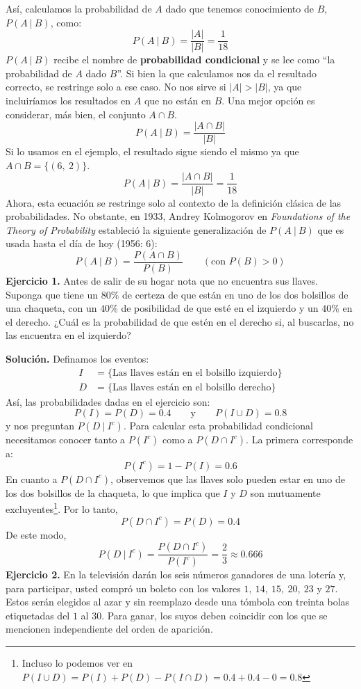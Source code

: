 \documentclass[12pt]{article}
\begin{document}
Así, calculamos la probabilidad de $A$ dado que tenemos conocimiento de $B$, $P(A \ | \ B)$, como:
\[
  P(A \ | \ B) = \frac{|A|}{|B|} = \frac{1}{18}
\]
$P(A \ | \ B)$ recibe el nombre de \textbf{probabilidad condicional} y se lee como ``la probabilidad de $A$ dado $B$''. Si bien la que calculamos nos da el resultado correcto, se restringe solo a ese caso. No nos sirve si $|A| > |B|$, ya que incluiríamos los resultados en $A$ que no están en $B$. Una mejor opción es considerar, más bien, el conjunto $A \cap B$.
\[
  P(A \ | \ B) = \frac{|A \cap B|}{|B|}
\]
Si lo usamos en el ejemplo, el resultado sigue siendo el mismo ya que $A \cap B = \{(6, \ 2)\}$.
\[
  P(A \ | \ B) = \frac{|A \cap B|}{|B|} = \frac{1}{18}
\]
Ahora, esta ecuación se restringe solo al contexto de la definición clásica de las probabilidades. No obstante, en 1933, Andrey Kolmogorov en \textit{Foundations of the Theory of Probability} estableció la siguiente generalización de $P(A \ | \ B)$ que es usada hasta el día de hoy (1956: 6):
\[
  P(A \ | \ B) = \frac{P(A \cap B)}{P(B)} \qquad \left(\text{con } P(B) > 0\right)
\]
\textbf{Ejercicio 1.} Antes de salir de su hogar nota que no encuentra sus llaves. Suponga que tiene un $80\%$ de certeza de que están en uno de los dos bolsillos de una chaqueta, con un $40\%$ de posibilidad de que esté en el izquierdo y un $40\%$ en el derecho. ¿Cuál es la probabilidad de que estén en el derecho si, al buscarlas, no las encuentra en el izquierdo?

\textbf{Solución.} Definamos los eventos:
\begin{align*}
  I &= \{\text{Las llaves están en el bolsillo izquierdo}\} \\
  D &= \{\text{Las llaves están en el bolsillo derecho}\}
\end{align*}
Así, las probabilidades dadas en el ejercicio son:
\[
  P(I) = P(D) = 0.4 \qquad \text{y} \qquad P(I \cup D) = 0.8
\]
y nos preguntan $P(D \ | \ I^{c})$. Para calcular esta probabilidad condicional necesitamos conocer tanto a $P(I^{c})$ como a $P(D \cap I^{c})$. La primera corresponde a:
\[
  P(I^{c}) = 1 - P(I) = 0.6
\]
En cuanto a $P(D \cap I^{c})$, observemos que las llaves solo pueden estar en uno de los dos bolsillos de la chaqueta, lo que implica que $I$ y $D$ son mutuamente excluyentes\footnote{Incluso lo podemos ver en $P(I \cup D) = P(I) + P(D) - P(I \cap D) = 0.4 + 0.4 - 0 = 0.8$}. Por lo tanto,
\[
  P(D \cap I^{c}) = P(D) = 0.4
\]
De este modo,
\[
  P(D \ | \ I^{c}) = \frac{P(D \cap I^{c})}{P(I^{c})} = \frac{2}{3} \approx 0.666
\]
\textbf{Ejercicio 2.} En la televisión darán los seis números ganadores de una lotería y, para participar, usted compró un boleto con los valores $1, \ 14, \ 15, \ 20, \ 23$ y $27$. Estos serán elegidos al azar y sin reemplazo desde una tómbola con treinta bolas etiquetadas del $1$ al $30$. Para ganar, los suyos deben coincidir con los que se mencionen independiente del orden de aparición.
\end{document}

